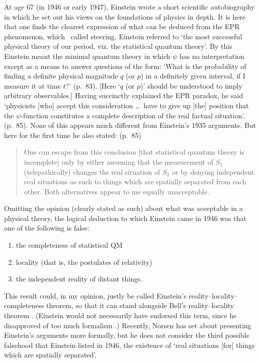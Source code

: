 \documentclass[12pt]{iopart}
\begin{document}
At age 67 (in 1946 or early 1947), Einstein wrote a short scientific autobiography \cite{Ein46} in which he set out his views on the foundations of physics in depth. It is here that one finds the clearest expression of what can be deduced from the EPR phenomenon, which \sch\ called steering. Einstein referred to `the most successful physical theory of our period, viz. the statistical quantum theory'. By this Einstein meant the minimal quantum theory in which $\psi$ has no interpretation except as a means to answer questions of the form: 
`What is the probability of finding a definite physical magnitude $q$ (or $p$) in a definitely given interval, if I measure it at time $t$?' \cite{Ein46} (p.~83).  [Here `$q$ (or $p$)' should be understood to imply arbitrary observables.] Having succinctly explained the EPR paradox, he said `physicists [who] accept this consideration \ldots\ have to give up [the] position that the $\psi$-function constitutes a complete description of the real factual situation'. \cite{Ein46} (p.~85). None of this appears much  different from Einstein's 1935 arguments. But here for the first time he also stated:  \cite{Ein46} (p.~85)  
\begin{quote}
  One can escape from this conclusion [that statistical quantum theory is incomplete] only by either assuming that the measurement of $S_1$ (telepathically) changes the real situation of $S_2$ or by denying independent real situations as such to things which are spatially separated from each other. Both alternatives appear to me equally unacceptable.
  \end{quote}
  
 Omitting the opinion (clearly stated as such) about what was acceptable in a physical theory,
 the logical deduction to which Einstein came in 1946 was that  one of the following is false:
\begin{enumerate}
\item the completeness of statistical QM
\item locality (that is, the postulates of relativity)
\item the independent reality of distant things.
\end{enumerate}     
This result could, in my opinion, justly be called Einstein's reality--locality--completeness theorem, 
so that it can stand alongside Bell's reality--locality theorem \cite{Bel64}. (Einstein would not necessarily have endorsed this term, since he disapproved of too much formalism \cite{Fin96}.) Recently, Norsen \cite{Nor05,Nor04} has set about presenting Einstein's arguments more formally, but he does not consider the third possible falsehood that Einstein listed in 1946, the existence of `real situations [for] things which are spatially separated'. 
\end{document}
